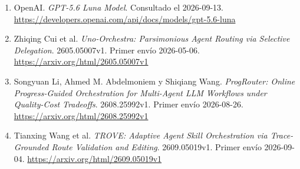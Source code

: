 \begin{enumerate}
\item OpenAI. \textit{GPT-5.6 Luna Model}. Consultado el 2026-09-13. \url{https://developers.openai.com/api/docs/models/gpt-5.6-luna}
\item Zhiqing Cui et al. \textit{Uno-Orchestra: Parsimonious Agent Routing via Selective Delegation}. 2605.05007v1. Primer envío 2026-05-06. \url{https://arxiv.org/html/2605.05007v1}
\item Songyuan Li, Ahmed M. Abdelmoniem y Shiqiang Wang. \textit{ProgRouter: Online Progress-Guided Orchestration for Multi-Agent LLM Workflows under Quality-Cost Tradeoffs}. 2608.25992v1. Primer envío 2026-08-26. \url{https://arxiv.org/html/2608.25992v1}
\item Tianxing Wang et al. \textit{TROVE: Adaptive Agent Skill Orchestration via Trace-Grounded Route Validation and Editing}. 2609.05019v1. Primer envío 2026-09-04. \url{https://arxiv.org/html/2609.05019v1}
\end{enumerate}
\endgroup
